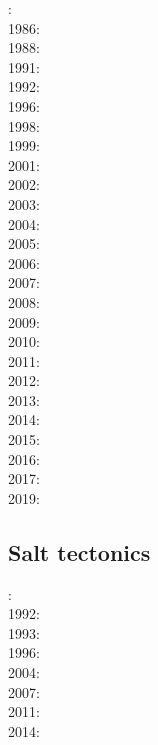 : \cite{bosw85}\\
1986: \cite{hoen86b}\cite{zupf86}\cite{zupa86}\cite{mofr86}\\
1988: \cite{bums88}\\
1991: \cite{trbr91}\cite{buck91}\\
1992: \cite{zieg92b}\\
1996: \cite{dusa96}\cite{beda96}\\
1998: \cite{rafm98}\\
1999: \cite{brun99}\cite{bulp99}\\
2001: \cite{hupc01}\\
2002: \cite{hube02}\cite{hani02}\cite{dabm02}\\
2003: \cite{hube03}\cite{hani03}\cite{covb03}\\
2004: \cite{hier04}\\
2005: \cite{hubb05}\cite{coub05}\\
2006: \cite{tibs06}\cite{coma06}\\
2007: \cite{huha07}\cite{macl07}\\
2008: \cite{cort08}\\
2009: \cite{agcz09}\cite{kekj09}\\
2010: \cite{aubh10}\\
2011: \cite{alht11}\\
2012: \cite{alht12}\cite{brps12}\\
2013: \cite{alhf13}\cite{brau13}\cite{chbe13}\cite{knak13}\cite{kern13}\cite{mipf13}\\
2014: \cite{hebr14}\cite{lige14}\cite{brun14}\cite{kobf14}\\
2015: \cite{nabu15}\\
2016: \cite{olbm16}\cite{jekm16}\cite{zwsn16}\\
2017: \cite{lemh17}\\
2019: \cite{lisp19}\cite{zwsb19}

\subsection*{Salt tectonics}

: \cite{tars91}\\
1992: \cite{zaju92}\\
1993: \cite{nabr93}\\
1996: \cite{maar96}\\
2004: \cite{istt04}\\
2007: \cite{huja07}\\
2011: \cite{brfo11}\\
2014: \cite{bakp14}


